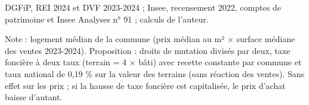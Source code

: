 DGFiP, REI 2024 et DVF 2023-2024 ; Insee, recensement 2022, comptes de patrimoine et Insee Analyses n° 91 ; calculs de l'auteur.\par Note : logement médian de la commune (prix médian au m² $\times$ surface médiane des ventes 2023-2024). Proposition : droits de mutation divisés par deux, taxe foncière à deux taux (terrain = 4 $\times$ bâti) avec recette constante par commune et taux national de 0,19 \% sur la valeur des terrains (sans réaction des ventes). Sans effet sur les prix ; si la hausse de taxe foncière est capitalisée, le prix d'achat baisse d'autant.
